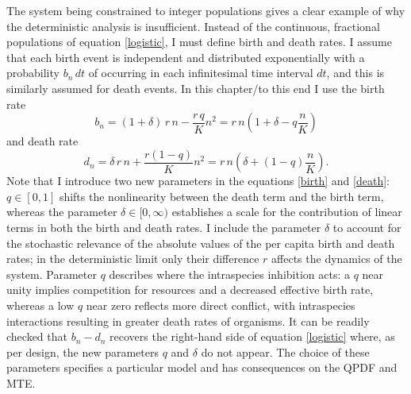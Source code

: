 The system being constrained to integer populations gives a clear example of why the deterministic analysis is insufficient. 
Instead of the continuous, fractional populations of equation \ref{logistic}, I must define birth and death rates. 
I assume that each birth event is independent and distributed exponentially with a probability $b_n\,dt$ of occurring in each infinitesimal time interval $dt$, and this is similarly assumed for death events. %
In this chapter/to this end I use the birth rate
\begin{equation}
b_n = (1 + \delta)\,r\,n - \frac{r\,q}{K}n^2 = r\,n\left(1+\delta-q\frac{n}{K}\right)
\label{birth}
\end{equation}
and death rate
\begin{equation}
d_n = \delta\,r\,n + \frac{r(1-q)}{K} n^2 = r\,n\left(\delta+(1-q)\frac{n}{K}\right).
\label{death}
\end{equation}
Note that I introduce two new parameters in the equations \ref{birth} and \ref{death}: $q\in[0,1]$ shifts the nonlinearity between the death term and the birth term, whereas the parameter $\delta\in[0,\infty)$ establishes a scale for the contribution of linear terms in both the birth and death rates. 
I include the parameter $\delta$ to account for the stochastic relevance of the absolute values of the per capita birth and death rates; in the deterministic limit only their difference $r$ affects the dynamics of the system. 
Parameter $q$ describes where the intraspecies inhibition acts: a $q$ near unity implies competition for resources and a decreased effective birth rate, whereas a low $q$ near zero reflects more direct conflict, with intraspecies interactions resulting in greater death rates of organisms. 
It can be readily checked that $b_n-d_n$ recovers the right-hand side of equation \ref{logistic} where, as per design, the new parameters $q$ and $\delta$ do not appear.
The choice of these parameters specifies a particular model and has consequences on the QPDF and MTE. 

